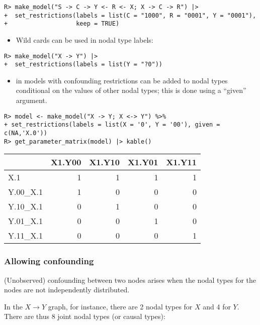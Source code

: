 \documentclass[
  11pt,
  article]{jss}
\providecommand{\tightlist}{%
  \setlength{\itemsep}{0pt}\setlength{\parskip}{0pt}}\usepackage{longtable,booktabs,array}
\begin{document}
\begin{verbatim}
R> make_model("S -> C -> Y <- R <- X; X -> C -> R") |>
+  set_restrictions(labels = list(C = "1000", R = "0001", Y = "0001"), 
+                   keep = TRUE)
\end{verbatim}

\begin{itemize}
\tightlist
\item
  Wild cards can be used in nodal type labels:
\end{itemize}

\begin{verbatim}
R> make_model("X -> Y") |>
+  set_restrictions(labels = list(Y = "?0"))
\end{verbatim}

\begin{itemize}
\tightlist
\item
  in models with confounding restrictions can be added to nodal types
  conditional on the values of other nodal types; this is done using a
  ``given'' argument.
\end{itemize}

\begin{verbatim}
R> model <- make_model("X -> Y; X <-> Y") %>%
+ set_restrictions(labels = list(X = '0', Y = '00'), given = c(NA,'X.0'))
R> get_parameter_matrix(model) |> kable()
\end{verbatim}

\begin{tabular}{l|r|r|r|r}
\hline
  & X1.Y00 & X1.Y10 & X1.Y01 & X1.Y11\\
\hline
X.1 & 1 & 1 & 1 & 1\\
\hline
Y.00\_X.1 & 1 & 0 & 0 & 0\\
\hline
Y.10\_X.1 & 0 & 1 & 0 & 0\\
\hline
Y.01\_X.1 & 0 & 0 & 1 & 0\\
\hline
Y.11\_X.1 & 0 & 0 & 0 & 1\\
\hline
\end{tabular}

\hypertarget{sec-confounding}{%
\subsubsection{Allowing confounding}\label{sec-confounding}}

(Unobserved) confounding between two nodes arises when the nodal types
for the nodes are not independently distributed.

In the \(X \rightarrow Y\) graph, for instance, there are 2 nodal types
for \(X\) and 4 for \(Y\). There are thus 8 joint nodal types (or causal
types):
\end{document}
